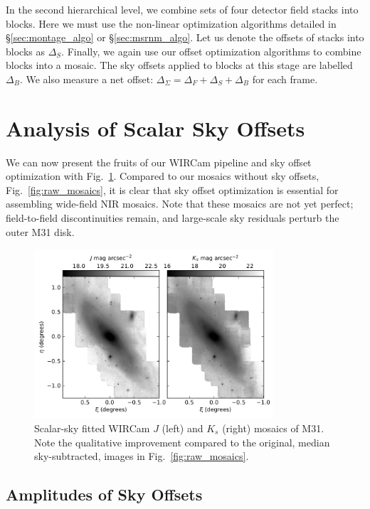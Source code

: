 \documentclass[iop]{emulateapj}
\newcommand{\Fig}[1]{Fig.~\ref{fig:#1}}  %
\newcommand{\Sec}[1]{\S\ref{sec:#1}}  %
\begin{document}
In the second hierarchical level, we combine sets of four detector field stacks into blocks.
Here we must use the non-linear optimization algorithms detailed in \Sec{montage_algo} or \Sec{msrnm_algo}.
Let us denote the offsets of stacks into blocks as $\Delta_S$. Finally, we again use our offset optimization algorithms to combine blocks into a mosaic. The sky offsets applied to blocks at this stage are labelled $\Delta_B$. We also measure a net offset: $\Delta_\Sigma = \Delta_F + \Delta_S + \Delta_B$ for each frame.


\section{Analysis of Scalar Sky Offsets}
\label{sec:scalaranalysis}

We can now present the fruits of our WIRCam pipeline and sky offset optimization with \Fig{scalar_mosaics}.
Compared to our mosaics without sky offsets, \Fig{raw_mosaics}, it is clear that sky offset optimization is essential for assembling wide-field NIR mosaics.
Note that these mosaics are not yet perfect; field-to-field discontinuities remain, and large-scale sky residuals perturb the outer M31 disk.

\begin{figure}[t]
	\centering
		\includegraphics[width=3.5in]{figs/scalar_mosaics}
	\caption{Scalar-sky fitted WIRCam $J$ (left) and $K_s$ (right) mosaics of M31. Note the qualitative improvement compared to the original, median sky-subtracted, images in \Fig{raw_mosaics}.}
	\label{fig:scalar_mosaics}
\end{figure}

\subsection{Amplitudes of Sky Offsets}
\label{sec:offset_amplitudes}
\end{document}
